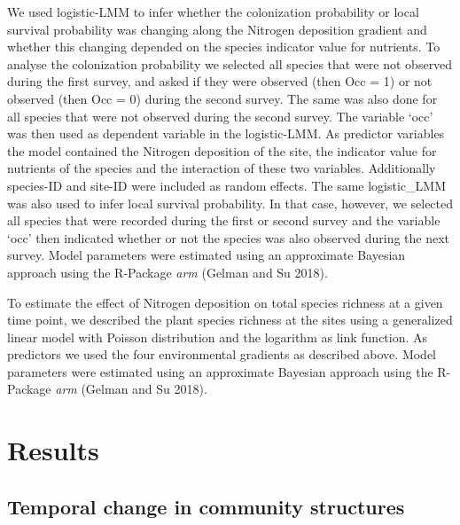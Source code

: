 \documentclass[fleqn,10pt,lineno]{wlpeerj} %
\theoremstyle{definition}
\theoremstyle{definition}
\theoremstyle{definition}
\theoremstyle{remark}
\begin{document}
We used logistic-LMM to infer whether the colonization probability or
local survival probability was changing along the Nitrogen deposition
gradient and whether this changing depended on the species indicator
value for nutrients. To analyse the colonization probability we selected
all species that were not observed during the first survey, and asked if
they were observed (then Occ = 1) or not observed (then Occ = 0) during
the second survey. The same was also done for all species that were not
observed during the second survey. The variable `occ' was then used as
dependent variable in the logistic-LMM. As predictor variables the model
contained the Nitrogen deposition of the site, the indicator value for
nutrients of the species and the interaction of these two variables.
Additionally species-ID and site-ID were included as random effects. The
same logistic\_LMM was also used to infer local survival probability. In
that case, however, we selected all species that were recorded during
the first or second survey and the variable `occ' then indicated whether
or not the species was also observed during the next survey. Model
parameters were estimated using an approximate Bayesian approach using
the R-Package \emph{arm} (Gelman and Su 2018).

To estimate the effect of Nitrogen deposition on total species richness
at a given time point, we described the plant species richness at the
sites using a generalized linear model with Poisson distribution and the
logarithm as link function. As predictors we used the four environmental
gradients as described above. Model parameters were estimated using an
approximate Bayesian approach using the R-Package \emph{arm} (Gelman and
Su 2018).

\section*{Results}\label{results}

\subsection*{Temporal change in community
structures}\label{temporal-change-in-community-structures}
\end{document}
